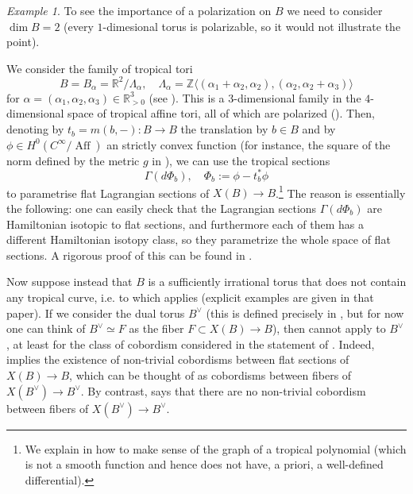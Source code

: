 \documentclass[10pt]{amsart}
\newcounter{mainthm}
\theoremstyle{definition}
\theoremstyle{remark}
\newtheorem{example}[thm]{Example}
\def\R{\mathbb{R}}
\def\Z{\mathbb{Z}}
\DeclareMathOperator{\Aff}{Aff}
\newcommand{\vspan}[1]{\langle #1 \rangle}
\begin{document}
\begin{example}\label{ex:polarization_2_torus}
    To see the importance of a polarization on $B$ we need to consider $\dim B = 2$ (every $1$-dimesional torus is polarizable, so it would not illustrate the point).
    
    We consider the family of tropical tori
    $$
        B = B_{\alpha} = \R^2 / \Lambda_{\alpha}, \quad \Lambda_{\alpha} = \Z \vspan{(\alpha_1+\alpha_2, \alpha_2), (\alpha_2, \alpha_2+\alpha_3)}
    $$
    for $\alpha = (\alpha_1,\alpha_2,\alpha_3) \in \R^3_{>0}$ (see ).
    This is a $3$-dimensional family in the $4$-dimensional space of tropical affine tori, all of which are polarized ().
    Then, denoting by $t_b = m(b,-): B \to B$ the translation by $b \in B$ and by $\phi\in H^0(C^\infty/\Aff)$ an strictly convex function (for instance, the square of the norm defined by the metric $g$ in ), we can use the tropical sections
    $$
    \Gamma(d\Phi_{b}), \quad \Phi_b := \phi - t_b^*\phi
    $$
    to parametrise flat Lagrangian sections of $X(B) \to B$.\footnote{We explain in  how to make sense of the graph of a tropical polynomial (which is not a smooth function and hence does not have, a priori, a well-defined differential).}
    The reason is essentially the following: one can easily check that the Lagrangian sections $\Gamma(d\Phi_b)$ are Hamiltonian isotopic to flat sections, and furthermore each of them has a different Hamiltonian isotopy class, so they parametrize the whole space of flat sections.
    A rigorous proof of this can be found in .

    Now suppose instead that $B$ is a sufficiently irrational torus that does not contain any tropical curve, i.e. to which \cite[Theorem 1.3]{sheridan2021lagrangian} applies (explicit examples are given in that paper).
    If we consider the dual torus $B^\vee$ (this is defined precisely in , but for now one can think of $B^\vee\simeq F$ as the fiber $F\subset X(B) \to B$), then  cannot apply to $B^\vee$, at least for the class of cobordism considered in the statement of \cite[Theorem 1.3]{sheridan2021lagrangian}.
    Indeed,  implies the existence of non-trivial cobordisms between flat sections of $X(B) \to B$, which can be thought of as cobordisms between fibers of $X(B^\vee) \to B^\vee$. 
    By contrast,  \cite[Theorem 1.3]{sheridan2021lagrangian} says that there are no non-trivial cobordism between fibers of $X(B^\vee) \to B^\vee$.
\end{example}
   
\end{document}
